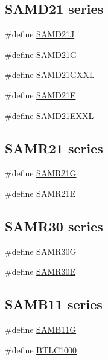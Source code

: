 \subsection*{S\+A\+M\+D21 series}
\begin{DoxyCompactItemize}
\item 
\#define \mbox{\hyperlink{group__sam__part__macros__group_ga55d9b92dcaef90e466055b1792d06d8a}{S\+A\+M\+D21J}}
\item 
\#define \mbox{\hyperlink{group__sam__part__macros__group_ga38b8f6ee1c68255f5fc157f564bb9db9}{S\+A\+M\+D21G}}
\item 
\#define \mbox{\hyperlink{group__sam__part__macros__group_ga8166031d150c68969ecd40a7809aa146}{S\+A\+M\+D21\+G\+X\+XL}}
\item 
\#define \mbox{\hyperlink{group__sam__part__macros__group_gaea4cafdd5e8defbc23a43eb5bb10578c}{S\+A\+M\+D21E}}
\item 
\#define \mbox{\hyperlink{group__sam__part__macros__group_ga41c43019594750ac3d6f0b210cd149f6}{S\+A\+M\+D21\+E\+X\+XL}}
\end{DoxyCompactItemize}
\subsection*{S\+A\+M\+R21 series}
\begin{DoxyCompactItemize}
\item 
\#define \mbox{\hyperlink{group__sam__part__macros__group_gad414d7dfda114b1381015378bb6a5665}{S\+A\+M\+R21G}}
\item 
\#define \mbox{\hyperlink{group__sam__part__macros__group_ga29500011ca9cccd91d5131b74ba45ece}{S\+A\+M\+R21E}}
\end{DoxyCompactItemize}
\subsection*{S\+A\+M\+R30 series}
\begin{DoxyCompactItemize}
\item 
\#define \mbox{\hyperlink{group__sam__part__macros__group_ga94739d4be369821d24f77b4c9ba2ce6e}{S\+A\+M\+R30G}}
\item 
\#define \mbox{\hyperlink{group__sam__part__macros__group_ga0eee38fa3fab84e5cf0f0f491a401a77}{S\+A\+M\+R30E}}
\end{DoxyCompactItemize}
\subsection*{S\+A\+M\+B11 series}
\begin{DoxyCompactItemize}
\item 
\#define \mbox{\hyperlink{group__sam__part__macros__group_ga9d75ea612675a9caabb228e7e0751ff7}{S\+A\+M\+B11G}}
\item 
\#define \mbox{\hyperlink{group__sam__part__macros__group_gaa7c0614df11bc3398897ee31d038dde7}{B\+T\+L\+C1000}}
\end{DoxyCompactItemize}
